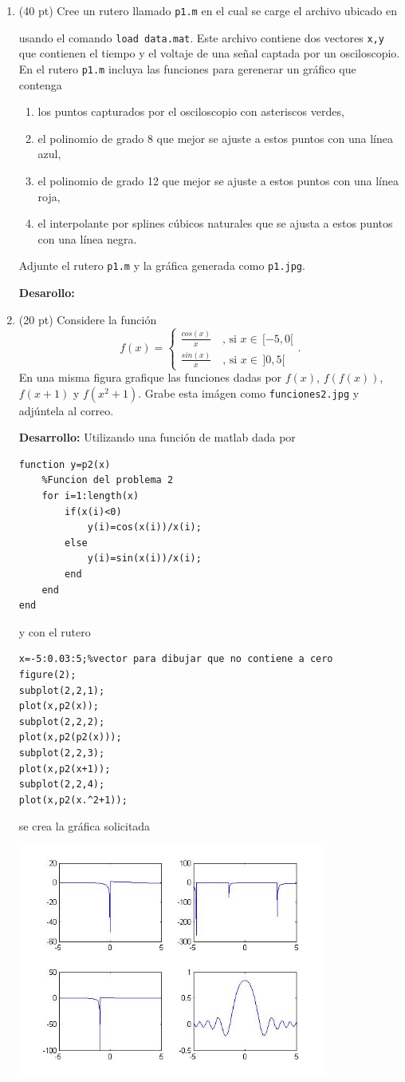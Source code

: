 \documentclass[11pt]{article}
\begin{document}
\begin{enumerate}
\item (40 pt) Cree un rutero llamado \texttt{p1.m} en el cual se carge el archivo ubicado en

usando el comando \texttt{load data.mat}. Este archivo contiene dos vectores \texttt{x,y} 
que contienen el tiempo y el voltaje de una señal captada por un osciloscopio. En el rutero
\texttt{p1.m} incluya las funciones para gerenerar un gr\'afico que contenga
\begin{enumerate}
	\item los puntos capturados por el osciloscopio con asteriscos verdes,
    \item el polinomio de grado 8 que mejor se ajuste a estos puntos con una línea azul,
    \item el polinomio de grado 12 que mejor se ajuste a estos puntos con una línea roja,
    \item el interpolante por splines c\'ubicos naturales que se ajusta a estos puntos con una línea negra.
\end{enumerate}
Adjunte el rutero \texttt{p1.m} y la gr\'afica generada como \texttt{p1.jpg}.

\textbf{Desarollo:} 


\item (20 pt) Considere la funci\'on
$$
f(x)=
\begin{cases}
\frac{cos(x)}{x} \quad  \text{, si } x\in\,[-5,0[\\
\frac{sin(x)}{x} \quad  \text{, si } x\in\,]0,5[
\end{cases}.
$$
En una misma figura grafique las funciones dadas por $f(x)$, $f(f(x))$, $f(x+1)$ y $f(x^2+1)$. Grabe esta im\'agen como \texttt{funciones2.jpg} y adj\'untela al correo.

\textbf{Desarrollo:} Utilizando una funci\'on de matlab dada por
\begin{lstlisting}
function y=p2(x)
    %Funcion del problema 2
    for i=1:length(x)
        if(x(i)<0)
            y(i)=cos(x(i))/x(i);
        else
            y(i)=sin(x(i))/x(i);
        end
    end
end
\end{lstlisting}
y con el rutero
\begin{lstlisting}
x=-5:0.03:5;%vector para dibujar que no contiene a cero
figure(2);
subplot(2,2,1);
plot(x,p2(x));
subplot(2,2,2);
plot(x,p2(p2(x)));
subplot(2,2,3);
plot(x,p2(x+1));
subplot(2,2,4);
plot(x,p2(x.^2+1));
\end{lstlisting}
se crea la gr\'afica solicitada

\includegraphics[width=0.8\textwidth]{funciones2.jpg} 
\fbox{20 pt}

\end{enumerate}
\end{document}
